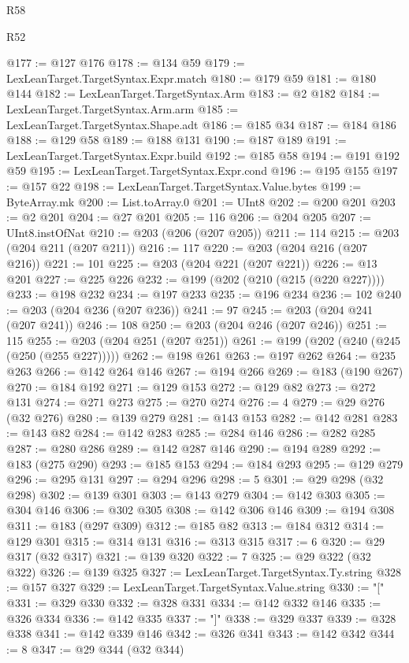 \begin{lexlean}{R58}
\begin{lexlean}{R52}
\begin{coremodule}
{{{{{{{{{{{{{{{{{{{{{{{{{{{{{{{{{{{{{{{{{{{{{{{{{{{{{{{{{{{{{{{{{{{{{{{{{{{{{{{{{{{{{{{{{{{{{{{{{{{{{{{{{{{{{{{{{{{{{{{{{{{{{{{{{{{{{{{{{{{{{{{{{{{{{{{{{{{{{{{{{{{{{{{{{{{{{{{{{{{{{{{{{{{{{{{{{{{{{{@177 := @127 @176
@178 := @134 @59
@179 := LexLeanTarget.TargetSyntax.Expr.match
@180 := @179 @59
@181 := @180 @144
@182 := LexLeanTarget.TargetSyntax.Arm
@183 := @2 @182
@184 := LexLeanTarget.TargetSyntax.Arm.arm
@185 := LexLeanTarget.TargetSyntax.Shape.adt
@186 := @185 @34
@187 := @184 @186
@188 := @129 @58
@189 := @188 @131
@190 := @187 @189
@191 := LexLeanTarget.TargetSyntax.Expr.build
@192 := @185 @58
@194 := @191 @192 @59
@195 := LexLeanTarget.TargetSyntax.Expr.cond
@196 := @195 @155
@197 := @157 @22
@198 := LexLeanTarget.TargetSyntax.Value.bytes
@199 := ByteArray.mk
@200 := List.toArray.{0}
@201 := UInt8
@202 := @200 @201
@203 := @2 @201
@204 := @27 @201
@205 := 116
@206 := @204 @205
@207 := UInt8.instOfNat
@210 := @203 (@206 (@207 @205))
@211 := 114
@215 := @203 (@204 @211 (@207 @211))
@216 := 117
@220 := @203 (@204 @216 (@207 @216))
@221 := 101
@225 := @203 (@204 @221 (@207 @221))
@226 := @13 @201
@227 := @225 @226
@232 := @199 (@202 (@210 (@215 (@220 @227))))
@233 := @198 @232
@234 := @197 @233
@235 := @196 @234
@236 := 102
@240 := @203 (@204 @236 (@207 @236))
@241 := 97
@245 := @203 (@204 @241 (@207 @241))
@246 := 108
@250 := @203 (@204 @246 (@207 @246))
@251 := 115
@255 := @203 (@204 @251 (@207 @251))
@261 := @199 (@202 (@240 (@245 (@250 (@255 @227)))))
@262 := @198 @261
@263 := @197 @262
@264 := @235 @263
@266 := @142 @264 @146
@267 := @194 @266
@269 := @183 (@190 @267)
@270 := @184 @192
@271 := @129 @153
@272 := @129 @82
@273 := @272 @131
@274 := @271 @273
@275 := @270 @274
@276 := 4
@279 := @29 @276 (@32 @276)
@280 := @139 @279
@281 := @143 @153
@282 := @142 @281
@283 := @143 @82
@284 := @142 @283
@285 := @284 @146
@286 := @282 @285
@287 := @280 @286
@289 := @142 @287 @146
@290 := @194 @289
@292 := @183 (@275 @290)
@293 := @185 @153
@294 := @184 @293
@295 := @129 @279
@296 := @295 @131
@297 := @294 @296
@298 := 5
@301 := @29 @298 (@32 @298)
@302 := @139 @301
@303 := @143 @279
@304 := @142 @303
@305 := @304 @146
@306 := @302 @305
@308 := @142 @306 @146
@309 := @194 @308
@311 := @183 (@297 @309)
@312 := @185 @82
@313 := @184 @312
@314 := @129 @301
@315 := @314 @131
@316 := @313 @315
@317 := 6
@320 := @29 @317 (@32 @317)
@321 := @139 @320
@322 := 7
@325 := @29 @322 (@32 @322)
@326 := @139 @325
@327 := LexLeanTarget.TargetSyntax.Ty.string
@328 := @157 @327
@329 := LexLeanTarget.TargetSyntax.Value.string
@330 := "["
@331 := @329 @330
@332 := @328 @331
@334 := @142 @332 @146
@335 := @326 @334
@336 := @142 @335
@337 := "]"
@338 := @329 @337
@339 := @328 @338
@341 := @142 @339 @146
@342 := @326 @341
@343 := @142 @342
@344 := 8
@347 := @29 @344 (@32 @344)
}}}}}}}}}}}}}}}}}}}}}}}}}}}}}}}}}}}}}}}}}}}}}}}}}}}}}}}}}}}}}}}}}}}}}}}}}}}}}}}}}}}}}}}}}}}}}}}}}}}}}}}}}}}}}}}}}}}}}}}}}}}}}}}}}}}}}}}}}}}}}}}}}}}}}}}}}}}}}}}}}}}}}}}}}}}}}}}}}}}}}}}}}}}}}}}}}}}}}}
\end{coremodule}
\end{lexlean}
\end{lexlean}
